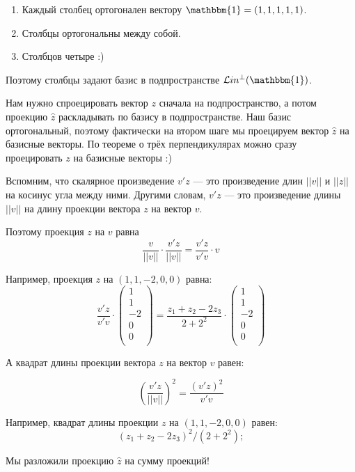 \documentclass[11pt,russian,]{article}
\newcommand{\1}{\mathbbm{1}}
\newcommand{\Lin}{\mathcal{L}in}
\newcommand{\Linp}{\Lin^{\perp}}
\begin{document}
\begin{enumerate}
\def\labelenumi{\arabic{enumi}.}
\item
  Каждый столбец ортогонален вектору \(\1 = (1, 1, 1, 1, 1)\).
\item
  Столбцы ортогональны между собой.
\item
  Столбцов четыре :)
\end{enumerate}

Поэтому столбцы задают базис в подпространстве \(\Linp (\1)\).

Нам нужно спроецировать вектор \(z\) сначала на подпространство, а потом
проекцию \(\hat z\) раскладывать по базису в подпространстве. Наш базис
ортогональный, поэтому фактически на втором шаге мы проецируем вектор
\(\hat z\) на базисные векторы. По теореме о трёх перпендикулярах можно
сразу проецировать \(z\) на базисные векторы :)

Вспомним, что скалярное произведение \(v'z\) --- это произведение длин
\(||v||\) и \(||z||\) на косинус угла между ними. Другими словам,
\(v'z\) --- это произведение длины \(||v||\) на длину проекции вектора
\(z\) на вектор \(v\).

Поэтому проекция \(z\) на \(v\) равна \[
\frac{v}{||v||} \cdot \frac{v'z}{||v||} =  \frac{v'z}{v'v} \cdot v
\]

Например, проекция \(z\) на \((1, 1, -2, 0, 0)\) равна: \[
\frac{v'z}{v'v} \cdot \begin{pmatrix}
1 \\
1 \\
-2 \\
0 \\
0 \\
\end{pmatrix} = 
\frac{z_1 + z_2 - 2z_3}{2+2^2} \cdot \begin{pmatrix}
1 \\
1 \\
-2 \\
0 \\
0 \\
\end{pmatrix}
\]

А квадрат длины проекции вектора \(z\) на вектор \(v\) равен:

\[
\left(\frac{v'z}{||v||}\right)^2 = \frac{(v'z)^2}{v'v}
\]

Например, квадрат длины проекции \(z\) на \((1, 1, -2, 0, 0)\) равен: \[
(z_1 + z_2 - 2z_3)^2/(2+2^2);
\]

Мы разложили проекцию \(\hat z\) на сумму проекций!
\end{document}

